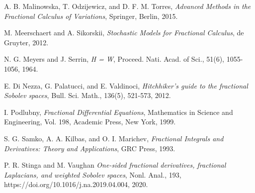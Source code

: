 \documentclass[leqno,final]{siamltex}
\numberwithin{equation}{section}
\renewcommand{\(}{\bigl(}
\renewcommand{\)}{\bigr)}
\begin{document}
\begin{thebibliography}{99}

{\sc A. B. Malinowska, T. Odzijewicz, and D. F. M. Torres},
  {\em Advanced Methods in the Fractional Calculus of Variations},
   Springer, Berlin,  2015.


{\sc M. Meerschaert and A. Sikorskii},
  {\em Stochastic Models for Fractional Calculus},  de Gruyter,  2012.
   
 
 {\sc N. G. Meyers and J. Serrin},
 {\em H = W}, 
Proceed. Nati. Acad. of Sci., 51(6), 1055-1056, 1964.

    {\sc E. Di Nezza, G. Palatucci, and  E. Valdinoci},
    {\em Hitchhiker's guide to the fractional Sobolev spaces},
    Bull. Sci. Math., 136(5), 521-573, 2012. 
    
    
   
{\sc I. Podlubny},
{\em Fractional Differential Equations}, 
Mathematics in Science and Engineering, Vol. 198, Academic Press,  New York, 1999.
    
    
    
    
{\sc S. G. Samko, A. A. Kilbas, and O. I. Marichev},
{\em Fractional Integrals and Derivatives: Theory and Applications},
GRC Press,  1993.

{\sc P. R. Stinga and M. Vaughan}
{\em One-sided fractional derivatives, fractional Laplacians, and weighted Sobolev spaces},
Nonl. Anal., 193, https://doi.org/10.1016/j.na.2019.04.004, 2020.
 
    


\end{thebibliography}
\end{document}
